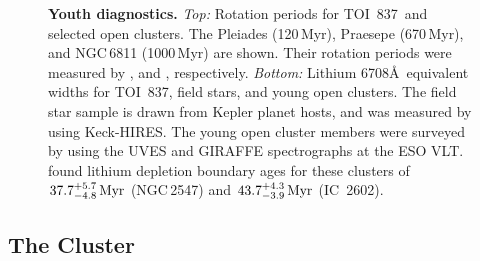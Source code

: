 \documentclass[12pt,twocolumn,tighten]{aastex63}
\newcommand{\tn}{TOI~837} %
\newcommand{\cn}{IC~2602} %
\begin{document}
\begin{figure}[!t]
	\begin{center}
		\leavevmode
		
		\vspace{-0.5cm}
	\end{center}
	\vspace{-0.7cm}
	\caption{ {\bf Youth diagnostics.}
  {\it Top:} Rotation periods for \tn\ and selected open clusters.
  The Pleiades (120$\,$Myr), Praesepe (670$\,$Myr), and NGC$\,$6811
  (1000$\,$Myr) are shown.  Their rotation periods were measured by
  \citet{rebull_rotation_2016a,douglas_poking_2017,douglas_k2_2019},
  and \citet{curtis_temporary_2019}, respectively.  {\it Bottom:}
  Lithium 6708\AA\ equivalent widths for \tn, field stars, and young
  open clusters.  The field star sample is drawn from Kepler planet
  hosts, and was measured by \citet{berger_identifying_2018} using
  Keck-HIRES.  The young open cluster members were surveyed by
  \citet{randich_gaiaeso_2018} using the UVES and GIRAFFE
  spectrographs at the ESO VLT.  \citet{randich_gaiaeso_2018} found
  lithium depletion boundary ages for these clusters of
  $37.7^{+5.7}_{-4.8}\,{\rm Myr}$ (NGC$\,$2547) and
  $43.7^{+4.3}_{-3.9}\,{\rm Myr}$ (\cn).  
    \label{fig:lithium_rotation}
	}
\end{figure}




\subsection{The Cluster}
\label{subsec:cluster}
\end{document}
